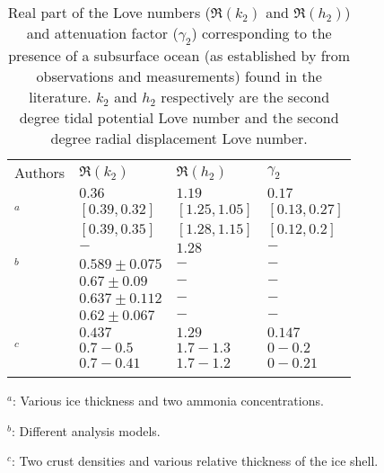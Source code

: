 \begin{table}
\vspace{0.7cm}
\centering
\begin{threeparttable}
\caption{Real part of the Love numbers ($\Re(k_2)$ and $\Re(h_2)$) and attenuation factor ($\gamma_2$) corresponding to the presence of a subsurface ocean (as established by \citet{sohl2003interior, sohl2014structural, baland2014titan, lefevre2014structure, beuthe2015tidal} from observations and measurements) found in the literature. $k_2$ and $h_2$ respectively are the second degree tidal potential Love number and the second degree radial displacement Love number. \label{tab:intro:gamma}}
\begin{tabular}{p{4.3cm}p{2.3cm}ll} \hline\noalign{\smallskip}

{Authors}&{$\Re(k_2)$}& {$\Re(h_2)$}&{$\gamma_2$} \\ \noalign{\smallskip}\hline\noalign{\smallskip}
 {\citet{sohl1995tidal}} &{$0.36$}&{$1.19$}& {$0.17$} \\ 
{\citet{sohl2003interior}$^a$} &{$[0.39,0.32]$}&{$[1.25,1.05]$}&{$[0.13,0.27]$} \\ 
{} &{$[0.39,0.35]$}&{$[1.28,1.15]$}& {$[0.12,0.2]$}\\ 
{\citet{nimmo2010shell}} &{$-$}&{$1.28$}& {$-$}\\ 
{\citet{iess2012tides}$^b$} &{$0.589\pm0.075$}&{$-$}& {$-$}\\ 
{} &{$0.67\pm0.09 $}&{$-$}& {$-$} \\ 
{} &{$0.637\pm0.112 $}&{$-$}& {$-$} \\
{\citet{durante2019titan}} &{$0.62\pm0.067$}&{$-$}& {$-$}\\ 
{\citet{sohl2014structural}} &{$0.437$}&{$1.29$}& {$0.147$}\\
{\citet{beuthe2015tidal}$^c$} &{$0.7-0.5$}&{$1.7-1.3$}& {$0-0.2$}\\
{} &{$0.7-0.41$}&{$1.7-1.2$}& {$0-0.21$}
 \\\noalign{\smallskip}\hline
\end{tabular}
\begin{tablenotes}
\small
\item $^a$: Various ice thickness and two ammonia concentrations.
\item $^b$: Different analysis models.
\item $^c$: Two crust densities and various relative thickness of the ice shell.
\end{tablenotes}
\end{threeparttable}
\end{table}

